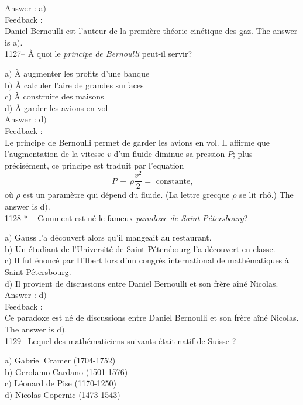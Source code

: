 ﻿\documentclass[letterpaper, 12pt]{article}
\begin{document}
Answer : a$)$\\

Feedback : \\
Daniel Bernoulli est l'auteur de la premi\`ere th\'eorie cin\'etique
des gaz.
The answer is a$)$.\\

1127-- \`A quoi le {\sl principe de Bernoulli} peut-il servir?

a$)$ \`A augmenter les profits d'une banque \\
b$)$ \`A calculer l'aire de grandes surfaces \\
c$)$ \`A construire des maisons \\
d$)$ \`A garder les avions en vol \\

Answer : d$)$\\

Feedback : \\
Le principe de Bernoulli permet de garder les avions en vol. Il
affirme que l'augmentation de la vitesse $v$ d'un fluide diminue sa
pression $P$; plus pr\'ecis\'ement, ce principe est traduit par
l'equation
$$\displaystyle{P\,+\,\rho\frac{v^2}2= \text{ constante,}}$$
o\`u $\rho$ est un param\`etre qui d\'epend du fluide. (La lettre
grecque $\rho$ se lit rh\^o.)
The answer is d$)$.\\

1128 * -- Comment est n\'e le fameux {\sl paradoxe de
Saint-P\'etersbourg}?

a$)$ Gauss l'a d\'ecouvert alors qu'il mangeait au restaurant. \\
b$)$ Un \'etudiant de l'Universit\'e de Saint-P\'etersbourg l'a d\'ecouvert
en classe. \\
c$)$ Il fut \'enonc\'e par Hilbert lors d'un congr\`es international de
math\'ematiques \`a Saint-P\'etersbourg.\\
d$)$ Il provient de discussions entre Daniel Bernoulli et son fr\`ere
a\^in\'e Nicolas.\\

Answer : d$)$\\

Feedback : \\
Ce paradoxe est n\'e de discussions entre Daniel Bernoulli et son
fr\`ere a\^in\'e Nicolas.
The answer is d$)$.\\

1129-- Lequel des math\'ematiciens suivants \'etait natif de Suisse
?

a$)$ Gabriel Cramer (1704-1752) \\
b$)$ Gerolamo Cardano (1501-1576) \\
c$)$ L\'eonard de Pise (1170-1250) \\
d$)$ Nicolas Copernic (1473-1543)\\
\end{document}

